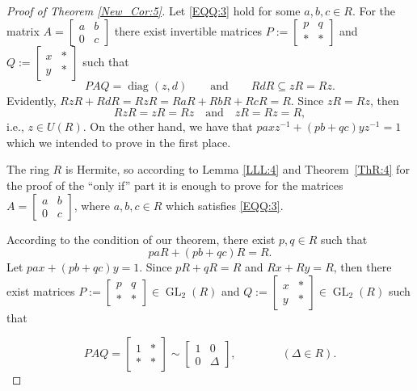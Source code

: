 \documentclass{cimart}
\DeclareMathOperator\GL{GL}
\DeclareMathOperator\diag{diag}
\begin{document}
\begin{proof}[Proof of Theorem \ref{New_Cor:5}]
Let \eqref{EQQ:3} hold   for some $a,b,c\in R$. For the matrix $A=\left[\begin{array}{cc}
                                                                         a& b \\
                                                                         0 & c
                                                                       \end{array}\right]$
there exist invertible matrices $P:=\left[\begin{array}{cc}p&q\\ *&*\end{array}\right]$ and  $Q:=\left[\begin{array}{cc}  x& * \\ y & * \end{array}\right]$ such that
\[
PAQ=\diag(z, d)\qquad \text{and}\qquad  RdR\subseteq zR=Rz.
\]
Evidently,  $RzR+RdR=RzR=RaR+RbR+RcR=R$. Since $zR=Rz$,  then
\[
RzR=zR=Rz \quad\text{and}\quad  zR=Rz=R,
\]
i.e., $z\in U(R)$. On the other hand,  we have that $paxz^{-1}+(pb+qc)yz^{-1}=1$ which we intended  to prove in the first place.

The ring $R$ is Hermite, so according  to  Lemma \ref{LLL:4} and Theorem~\ref{ThR:4} for the proof of the ``only if'' part  it is enough to prove for the matrices $A=\left[\begin{array}{cc}
a& b \\
0 & c
\end{array}\right]$,  where $a,b,c\in R$ which satisfies \eqref{EQQ:3}.

According to the condition of our theorem, there exist $p,q\in R$ such that \[paR+(pb+qc)R=R.\] Let $pax+(pb+qc)y=1$.  Since $pR+qR=R$ and   $Rx+Ry=R$,  then  there exist matrices
$P:=\left[\begin{array}{cc}p&q\\ *&*\end{array}\right]\in\GL_2(R)$ and $Q:=\left[\begin{array}{cc}  x& * \\ y & * \end{array}\right]\in \GL_2(R)$ such that

\[
PAQ=\left[\begin{array}{cc}1&*\\ *&*\end{array}\right]\sim\left[\begin{array}{cc}1&0\\ 0&\Delta\end{array}\right],\qquad \qquad(\Delta\in R).
\]
\end{proof}
\end{document}
